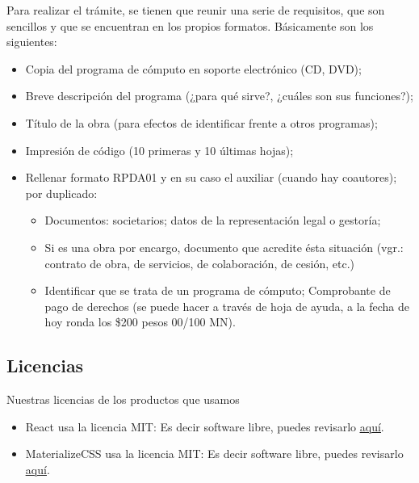 \documentclass[12pt, fleqn]{report}                             %
\theoremstyle{break}                                            %
\begin{document}
    Para realizar el trámite, se tienen que reunir una serie de requisitos, que son sencillos y que se encuentran en los propios formatos.  Básicamente son los siguientes:
    \begin{itemize}
        \item Copia del programa de cómputo en soporte electrónico (CD, DVD);
        \item Breve descripción del programa (¿para qué sirve?, ¿cuáles son sus funciones?);
        \item Título de la obra (para efectos de identificar frente a otros programas);
        \item Impresión de código (10 primeras y 10 últimas hojas);
        \item     Rellenar formato RPDA01 y en su caso el auxiliar (cuando hay coautores); por duplicado:
        \begin{itemize}
            \item Documentos:  societarios; datos de la representación legal o gestoría;
            \item  Si es una obra por encargo, documento que acredite ésta situación (vgr.: contrato de obra, de servicios, de colaboración, de cesión, etc.)
            \item Identificar que se trata de un programa de cómputo;
        Comprobante de pago de derechos (se puede hacer a través de hoja de ayuda, a la fecha de hoy ronda los \$200 pesos 00/100 MN).
            
        \end{itemize}
    \end{itemize}
    \clearpage

    
        

    \subsection{Licencias}
    
        Nuestras licencias de los productos que usamos 
        \begin{itemize}
            \item React usa la licencia MIT: Es decir software libre, puedes revisarlo \href{https://opensource.org/licenses/MIT}{\underline{aquí}}.
            \item MaterializeCSS usa la licencia MIT: Es decir software libre, puedes revisarlo \href{https://opensource.org/licenses/MIT}{\underline{aquí}}.
        \end{itemize}
\end{document}
